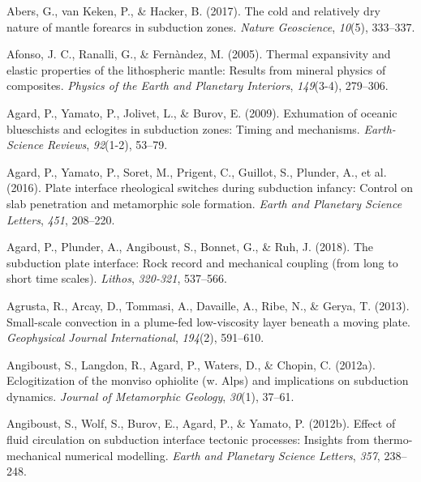 \hypertarget{refs_main}{}
\begin{CSLReferences}{1}{1}
\leavevmode{}%
Abers, G., van Keken, P., \& Hacker, B. (2017). The cold and relatively dry nature of mantle forearcs in subduction zones. \emph{Nature Geoscience}, \emph{10}(5), 333--337.

\leavevmode{}%
Afonso, J. C., Ranalli, G., \& Fernàndez, M. (2005). Thermal expansivity and elastic properties of the lithospheric mantle: Results from mineral physics of composites. \emph{Physics of the Earth and Planetary Interiors}, \emph{149}(3-4), 279--306.

\leavevmode{}%
Agard, P., Yamato, P., Jolivet, L., \& Burov, E. (2009). Exhumation of oceanic blueschists and eclogites in subduction zones: Timing and mechanisms. \emph{Earth-Science Reviews}, \emph{92}(1-2), 53--79.

\leavevmode{}%
Agard, P., Yamato, P., Soret, M., Prigent, C., Guillot, S., Plunder, A., et al. (2016). Plate interface rheological switches during subduction infancy: Control on slab penetration and metamorphic sole formation. \emph{Earth and Planetary Science Letters}, \emph{451}, 208--220.

\leavevmode{}%
Agard, P., Plunder, A., Angiboust, S., Bonnet, G., \& Ruh, J. (2018). The subduction plate interface: Rock record and mechanical coupling (from long to short time scales). \emph{Lithos}, \emph{320-321}, 537--566.

\leavevmode{}%
Agrusta, R., Arcay, D., Tommasi, A., Davaille, A., Ribe, N., \& Gerya, T. (2013). Small-scale convection in a plume-fed low-viscosity layer beneath a moving plate. \emph{Geophysical Journal International}, \emph{194}(2), 591--610.

\leavevmode{}%
Angiboust, S., Langdon, R., Agard, P., Waters, D., \& Chopin, C. (2012a). Eclogitization of the monviso ophiolite (w. Alps) and implications on subduction dynamics. \emph{Journal of Metamorphic Geology}, \emph{30}(1), 37--61.

\leavevmode{}%
Angiboust, S., Wolf, S., Burov, E., Agard, P., \& Yamato, P. (2012b). Effect of fluid circulation on subduction interface tectonic processes: Insights from thermo-mechanical numerical modelling. \emph{Earth and Planetary Science Letters}, \emph{357}, 238--248.


\end{CSLReferences}
